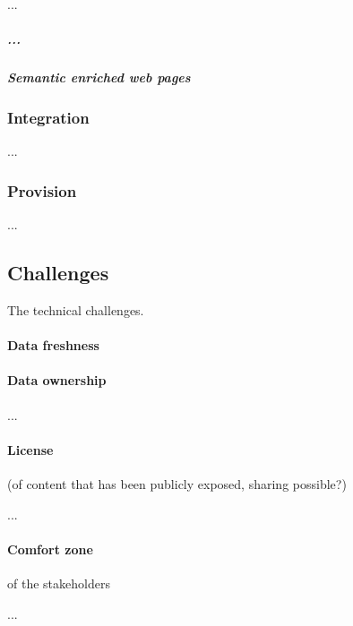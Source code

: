 \documentclass{article}
\begin{document}
...

\subparagraph{...}

\subparagraph{Semantic enriched web pages}

\subsubsection{Integration}
\label{technical-architecture-challenges:proposal:integration}
...

\subsubsection{Provision}
\label{technical-architecture-challenges:proposal:provision}
...

\subsection{Challenges}
\label{technical-architecture-challenges:challenges}

The technical challenges. 

\paragraph{Data freshness}
\label{technical-architecture-challenges:challenges:data-freshness}

\paragraph{Data ownership}
\label{technical-architecture-challenges:challenges:data-ownership}

...

\paragraph{License} (of content that has been publicly exposed, sharing possible?)
\label{technical-architecture-challenges:challenges:license}

...

\paragraph{Comfort zone} of the stakeholders
\label{technical-architecture-challenges:challenges:comfort-zone}

...

\end{document}
